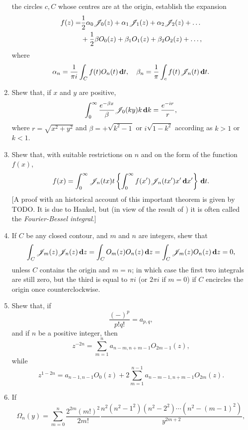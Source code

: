 \documentclass{book}
\begin{document}
\begin{enumerate}
  the circles $c,C$ whose centres are at the origin, establish the
  expansion
  \begin{align*}
    f(z)
    =&
    \frac{1}{2} \alpha_{0} \mathscr{J}_{0}(z) + \alpha_{1} \mathscr{J}_{1}(z)
    + \alpha_{2} \mathscr{J}_{2}(z) + \dots
    \\
    &
    + \frac{1}{2} \beta O_{0}(z) + \beta_{1} O_{1}(z) + \beta_{2} O_{2}(z) + \dots,
  \end{align*}
  where
  $$
  \alpha_{n}
  =
  \frac{1}{\pi i}
  \int_{C} f(t) O_{n}(t) \, \mathbf{d} t,
  \quad
  \beta_{n}
  =
  \frac{1}{\pi}
  \int_{c} f(t) \mathscr{J}_{n}(t) \, \mathbf{d} t.
  $$
\item
  Shew that, if $x$ and $y$ are positive,
  $$
  \int_{0}^{\infty}
  \frac{e^{-\beta x}}{\beta}
  \mathscr{J}_{0}(ky)
  k \, \mathbf{d} k
  =
  \frac{e^{-ir}}{r},
  $$
  where $r = \sqrt{x^{2}+y^{2}}$ and
  $\beta = +\sqrt{k^{2} - 1}$
  or
  $i \sqrt{1 - k^{2}}$
  according as $k>1$ or $k<1$.
\item
  Shew that, with suitable restrictions on $n$ and on the form of the
  function $f(x)$,
  $$
  f(x)
  =
  \int_{0}^{\infty} \mathscr{J}_{n}(tx) t
  \left\{ 
    \int_{0}^{\infty}
    f(x') \mathscr{J}_{n}(tx') x' \, \mathbf{d} x'
   \right\}
  \, \mathbf{d} t.
  $$
  [A proof with an historical account of this important theorem is
  given by TODO. It is due to Hankel, but (in view of the result of
  ) it is often called the \emph{Fourier-Bessel
    integral}.]
\item
  If $C$ be any closed contour, and $m$ and $n$ are integers, shew
  that
  $$
  \int_{C} \mathscr{J}_{m}(z) \mathscr{J}_{n}(z) \, \mathbf{d} z
  =
  \int_{C} O_{m}(z) O_{n}(z) \, \mathbf{d} z
  =
  \int_{C} \mathscr{J}_{m}(z) O_{n}(z) \, \mathbf{d} z
  =
  0,
  $$
  unless $C$ contains the origin and $m=n$; in which case the first
  two integrals are still zero, but the third is equal to $\pi i$ (or
  $2\pi i$ if $m=0$) if $C$ encircles the origin once
  counterclockwise.
\item
  Shew that, if
  $$
  \frac{(-)^{p}}{p!q!} = a_{p,q},
  $$
  and if $n$ be a positive integer, then
  $$
  z^{-2n}
  =
  \sum_{m=1}^{n} a_{n-m,n+m-1} O_{2m-1}(z),
  $$
  while
  $$
  z^{1-2n}
  =
  a_{n-1,n-1} O_{0}(z)
  +
  2 \sum_{m=1}^{n-1} a_{n-m-1,n+m-1} O_{2m}(z).
  $$
\item
  If
  $$
  \Omega_{n}(y)
  =
  \sum_{m=0}^{n}
  \frac{2^{2m} (m!)^{2}}{2m!}
  \frac{n^{2} (n^{2}-1^{2}) (n^{2}-2^{2}) \cdots (n^{2}-(m-1)^{2})}{y^{2m+2}},
$$
\end{enumerate}
\end{document}
